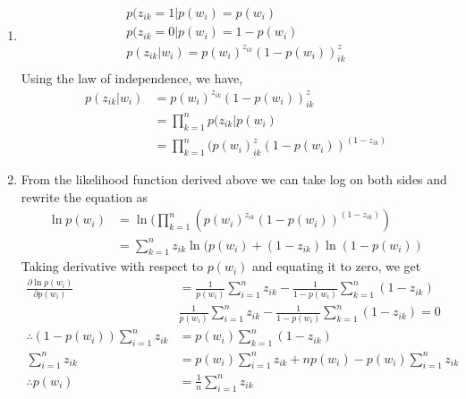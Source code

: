 \begin{enumerate}
		
			
	\item 		
		\begin{align*}
			p(z_{ik} = 1 | p(w_{i}) = p(w_{i}) \\
			p(z_{ik} = 0 | p(w_{i}) = 1 - p(w_{i}) \\	
			p(z_{ik} | w_{i}) = p(w_{i})^{z_{ik}}(1 - p(w_{i}))^z_{ik} \\			
		\end{align*}
		Using the law of independence, we have,
		\begin{align*}
			p(z_{ik} | w_{i}) & = p(w_{i})^{z_{ik}}(1 - p(w_{i}))^z_{ik} \\
			& = \prod_{k=1}^{n} p(z_{ik} | p(w_{i}) \\
			& = \prod_{k=1}^{n} (p(w_{i})^z_{ik}(1 - p(w_{i}))^{(1 - z_{ik})}
		\end{align*}
			
	\item  From the likelihood function derived above we can take log on both sides and rewrite the equation as
		\begin{align*}
			\ln p(w_{i}) &= \ln(\prod_{k=1}^{n} (p(w_{i})^{z_{ik}}(1 - p(w_{i}))^{(1 - z_{ik})}) \\
			&= \sum_{k=1}^{n} z_{ik}\ln(p(w_{i}) + (1 - z_{ik})\ln(1 - p(w_{i}))
		\end{align*}
		Taking derivative with respect to $p(w_{i})$ and equating it to zero, we get
		\begin{align*}
			\frac{\partial\ln p(w_{i})}{\partial p(w_{i})} & = \frac{1}{p(w_{i})}\sum_{i=1}^{n}z_{ik} - \frac{1}{1 - p(w_{i})} \sum_{k=1}^{n} (1 - z_{ik}) \\
			& \frac{1}{p(w_{i})}\sum_{i=1}^{n}z_{ik} - \frac{1}{1 - p(w_{i})} \sum_{k=1}^{n} (1 - z_{ik}) = 0 \\
			\therefore (1 - p(w_{i}))\sum_{i=1}^{n}z_{ik} & = p(w_{i})\sum_{k=1}^{n} (1 - z_{ik}) \\
			\sum_{i=1}^{n}z_{ik} & = p(w_{i})\sum_{i=1}^{n}z_{ik} + np(w_{i}) - p(w_{i})\sum_{i=1}^{n}z_{ik} \\
			\therefore p(w_{i}) &= \frac{1}{n}\sum_{i=1}^{n}z_{ik}
		\end{align*}
	
\end{enumerate}

